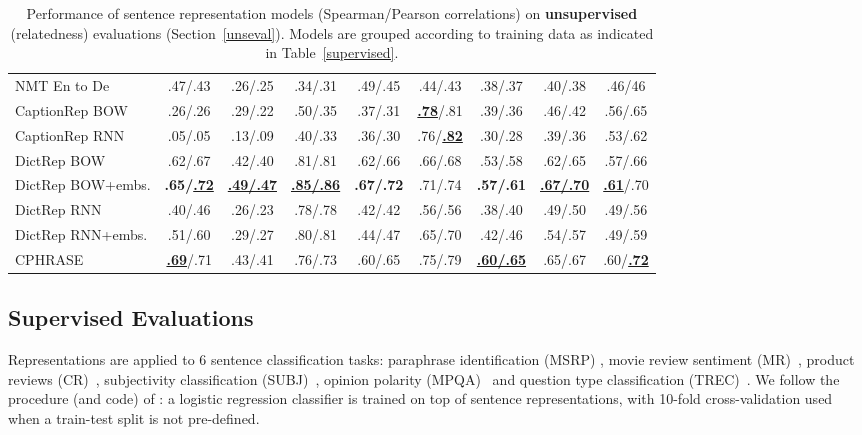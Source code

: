 \documentclass[11pt,letterpaper]{article}
\begin{document}
\begin{table*}[ht]
\begin{center}
{\begin{tabular}{l|cccccc|c|c}
          NMT En to De & .47/.43 & .26/.25 & .34/.31 & .49/.45 & .44/.43 & .38/.37 & .40/.38  &.46/46 \\
          CaptionRep BOW & .26/.26 & .29/.22	& .50/.35	& .37/.31 &  \underline{ \bf .78}/.81 & .39/.36 & .46/.42 & .56/.65 \\
          CaptionRep RNN & .05/.05	& .13/.09	& .40/.33	& .36/.30	& .76/\underline{\bf .82}	& .30/.28 & .39/.36 & .53/.62\\
                    DictRep BOW & .62/.67 	&.42/.40	&.81/.81	&.62/.66	&.66/.68	&.53/.58	&.62/.65 & .57/.66\\
          DictRep BOW+embs. & \bf .65/\underline{.72}	& \bf \underline{.49/.47}	& \bf  \underline{.85/.86}	& \bf  .67/.72	&.71/.74	& \bf .57/.61	&  \bf \underline{.67/.70}  & \underline{ {\bf .61}}/.70 \\
DictRep RNN & .40/.46	&.26/.23	&.78/.78	&.42/.42	&.56/.56	&.38/.40	&.49/.50 & .49/.56 \\
DictRep RNN+embs. & .51/.60	&.29/.27	&.80/.81	&.44/.47	&.65/.70	&.42/.46	&.54/.57 & .49/.59 \\
          \hline   
          CPHRASE & \underline{\bf .69}/.71 & .43/.41 & .76/.73  & .60/.65 & .75/.79 &  \bf \underline{.60/.65} &  .65/.67 & .60/\underline{\bf .72} \\
           
          \hline 
        \end{tabular}

    }
    \caption{\label{unsupervised} Performance of sentence representation models (Spearman/Pearson correlations) on {\bf unsupervised} (relatedness) evaluations (Section~\ref{unseval}). Models are grouped according to training data as indicated in Table~\ref{supervised}.}
  \end{center}
  \vspace*{-4ex} 
\end{table*}





\subsection{Supervised Evaluations}
\label{supersec}
Representations are applied to 6 sentence classification tasks: paraphrase identification (MSRP) \cite{dolan2004unsupervised}, movie review sentiment (MR)~\cite{pang2005seeing}, product reviews (CR)~\cite{hu2004mining}, subjectivity classification (SUBJ)~\cite{pang2004sentimental}, opinion polarity (MPQA)~\cite{wiebe2005annotating} and question type classification (TREC)~\cite{voorhees2002overview}. We follow the procedure (and code) of : a logistic regression classifier is trained on top of sentence representations, with 10-fold cross-validation used when a train-test split is not pre-defined. 
\end{document}

